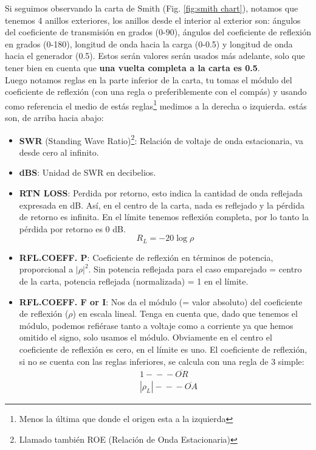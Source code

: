 \documentclass[
	12pt, %
	fleqn, %
	a4paper, %
	oneside, %
]{LegrandOrangeBook}
\begin{document}
Si seguimos observando la carta de Smith (Fig. \ref{fig:smith chart}), notamos que tenemos 4 anillos exteriores, los anillos desde el interior al exterior son: ángulos del coeficiente de transmisión en grados (0-90), ángulos del coeficiente de reflexión en grados (0-180), longitud de onda hacia la carga (0-0.5) y longitud de onda hacia el generador (0.5). Estos serán valores serán usados más adelante, solo que tener bien en cuenta que \textbf{una vuelta completa a la carta es 0.5}.\\
Luego notamos reglas en la parte inferior de la carta, tu tomas el módulo del coeficiente de reflexión (con una regla o preferiblemente con el compás) y usando como referencia el medio de estás reglas\footnote{Menos la última que donde el origen esta a la izquierda} medimos a la derecha o izquierda. estás son, de arriba hacia abajo:
\begin{itemize}
\item \textbf{SWR} (Standing Wave Ratio)\footnote{Llamado también ROE (Relación de Onda Estacionaria)}: Relación de voltaje de onda estacionaria, va desde cero al infinito.
\item \textbf{dBS}: Unidad de SWR en decibelios.
\item \textbf{RTN LOSS}: Perdida por retorno, esto indica
la cantidad de onda reflejada expresada en dB. Así, en el centro de la carta, nada es reflejado y la pérdida de retorno es infinita. En el límite tenemos reflexión completa, por lo tanto la pérdida por retorno es 0 dB.
\begin{equation}
R_L=-20\log\rho
\end{equation}
\item \textbf{RFL.COEFF. P}: Coeficiente de reflexión en términos de potencia, proporcional a $|\rho|^2$. Sin potencia reflejada para el caso emparejado = centro de la carta, potencia reflejada (normalizada) = 1 en el límite.
\item \textbf{RFL.COEFF. F or I}: Nos da el módulo (= valor absoluto) del coeficiente de reflexión ($\rho$) en escala lineal. Tenga en cuenta que, dado que tenemos el módulo, podemos refiérase tanto a voltaje como a corriente ya que hemos omitido el signo, solo usamos el módulo. Obviamente en el centro el coeficiente de reflexión es cero, en el límite es uno. El coeficiente de reflexión, si no se cuenta con las reglas inferiores, se calcula con una regla de 3 simple:
\begin{align*}
& 1 -\!\!\!-\!\!\!- \overline{OR}\\
& |\rho_L| -\!\!\!-\!\!\!- \overline{OA}

\end{align*}
\end{itemize}
\end{document}
